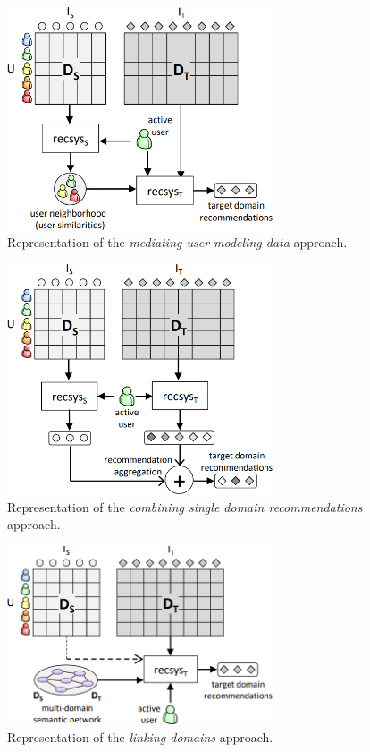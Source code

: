 \begin{figure}[hbt!]
\centering
\includegraphics[width=0.7\textwidth]{pictures/mediating-user-modeling-data}
\caption{Representation of the \textit{mediating user modeling data} approach. \cite{10.1007/978-1-4899-7637-6_27}}
\label{fg:mediating-user-modeling-data}
\end{figure}
\begin{figure}[hbt!]
\centering
\includegraphics[width=0.7\textwidth]{pictures/combining-single-domain-recommendations}
\caption{Representation of the \textit{combining single domain recommendations} approach. \cite{10.1007/978-1-4899-7637-6_27}}
\label{fg:combining-single-domain-recommendations}
\end{figure}
\begin{figure}[hbt!]
\centering
\includegraphics[width=0.7\textwidth]{pictures/linking-domains}
\caption{Representation of the \textit{linking domains} approach. \cite{10.1007/978-1-4899-7637-6_27}}
\label{fg:linking-domains}
\end{figure}
